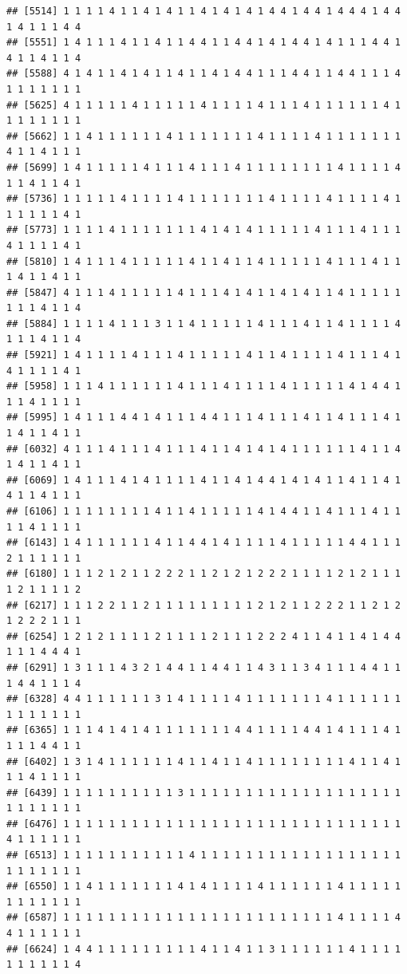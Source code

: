 \documentclass[
]{article}
\begin{document}
\begin{verbatim}
## [5514] 1 1 1 1 4 1 1 4 1 4 1 1 4 1 4 1 4 1 4 4 1 4 4 1 4 4 4 1 4 4 1 4 1 1 1 4 4
## [5551] 1 4 1 1 1 4 1 1 4 1 1 4 4 1 1 4 4 1 4 1 4 4 1 4 1 1 1 4 4 1 4 1 1 4 1 1 4
## [5588] 4 1 4 1 1 4 1 4 1 1 4 1 1 4 1 4 4 1 1 1 4 4 1 1 4 4 1 1 1 4 1 1 1 1 1 1 1
## [5625] 4 1 1 1 1 1 4 1 1 1 1 1 4 1 1 1 1 4 1 1 1 4 1 1 1 1 1 1 4 1 1 1 1 1 1 1 1
## [5662] 1 1 4 1 1 1 1 1 1 4 1 1 1 1 1 1 1 4 1 1 1 1 4 1 1 1 1 1 1 1 4 1 1 4 1 1 1
## [5699] 1 4 1 1 1 1 1 4 1 1 1 4 1 1 1 4 1 1 1 1 1 1 1 1 4 1 1 1 1 4 1 1 4 1 1 4 1
## [5736] 1 1 1 1 1 4 1 1 1 1 4 1 1 1 1 1 1 1 4 1 1 1 1 4 1 1 1 1 4 1 1 1 1 1 1 4 1
## [5773] 1 1 1 1 4 1 1 1 1 1 1 1 4 1 4 1 4 1 1 1 1 1 4 1 1 1 4 1 1 1 4 1 1 1 1 4 1
## [5810] 1 4 1 1 1 4 1 1 1 1 1 4 1 1 4 1 1 4 1 1 1 1 1 4 1 1 1 4 1 1 1 4 1 1 4 1 1
## [5847] 4 1 1 1 4 1 1 1 1 1 4 1 1 1 4 1 4 1 1 4 1 4 1 1 4 1 1 1 1 1 1 1 1 4 1 1 4
## [5884] 1 1 1 1 4 1 1 1 3 1 1 4 1 1 1 1 1 4 1 1 1 4 1 1 4 1 1 1 1 4 1 1 1 4 1 1 4
## [5921] 1 4 1 1 1 1 4 1 1 1 4 1 1 1 1 1 4 1 1 4 1 1 1 1 4 1 1 1 4 1 4 1 1 1 1 4 1
## [5958] 1 1 1 4 1 1 1 1 1 1 4 1 1 1 4 1 1 1 1 4 1 1 1 1 1 4 1 4 4 1 1 1 4 1 1 1 1
## [5995] 1 4 1 1 1 4 4 1 4 1 1 1 4 4 1 1 1 4 1 1 1 4 1 1 4 1 1 1 4 1 1 4 1 1 4 1 1
## [6032] 4 1 1 1 4 1 1 1 4 1 1 1 4 1 1 4 1 4 1 4 1 1 1 1 1 1 4 1 1 4 1 4 1 1 4 1 1
## [6069] 1 4 1 1 1 4 1 4 1 1 1 1 4 1 1 4 1 4 4 1 4 1 4 1 1 4 1 1 4 1 4 1 1 4 1 1 1
## [6106] 1 1 1 1 1 1 1 1 4 1 1 4 1 1 1 1 1 4 1 4 4 1 1 4 1 1 1 4 1 1 1 1 4 1 1 1 1
## [6143] 1 4 1 1 1 1 1 1 4 1 1 4 4 1 4 1 1 1 1 4 1 1 1 1 1 4 4 1 1 1 2 1 1 1 1 1 1
## [6180] 1 1 1 2 1 2 1 1 2 2 2 1 1 2 1 2 1 2 2 2 1 1 1 1 2 1 2 1 1 1 1 2 1 1 1 1 2
## [6217] 1 1 1 2 2 1 1 2 1 1 1 1 1 1 1 1 1 2 1 2 1 1 2 2 2 1 1 2 1 2 1 2 2 2 1 1 1
## [6254] 1 2 1 2 1 1 1 1 2 1 1 1 1 2 1 1 1 2 2 2 4 1 1 4 1 1 4 1 4 4 1 1 1 4 4 4 1
## [6291] 1 3 1 1 1 4 3 2 1 4 4 1 1 4 4 1 1 4 3 1 1 3 4 1 1 1 4 4 1 1 1 4 4 1 1 1 4
## [6328] 4 4 1 1 1 1 1 1 3 1 4 1 1 1 1 4 1 1 1 1 1 1 1 4 1 1 1 1 1 1 1 1 1 1 1 1 1
## [6365] 1 1 1 4 1 4 1 4 1 1 1 1 1 1 1 4 4 1 1 1 1 4 4 1 4 1 1 1 4 1 1 1 1 4 4 1 1
## [6402] 1 3 1 4 1 1 1 1 1 1 4 1 1 4 1 1 4 1 1 1 1 1 1 1 1 4 1 1 4 1 1 1 4 1 1 1 1
## [6439] 1 1 1 1 1 1 1 1 1 1 3 1 1 1 1 1 1 1 1 1 1 1 1 1 1 1 1 1 1 1 1 1 1 1 1 1 1
## [6476] 1 1 1 1 1 1 1 1 1 1 1 1 1 1 1 1 1 1 1 1 1 1 1 1 1 1 1 1 1 1 4 1 1 1 1 1 1
## [6513] 1 1 1 1 1 1 1 1 1 1 1 4 1 1 1 1 1 1 1 1 1 1 1 1 1 1 1 1 1 1 1 1 1 1 1 1 1
## [6550] 1 1 4 1 1 1 1 1 1 1 4 1 4 1 1 1 1 4 1 1 1 1 1 1 4 1 1 1 1 1 1 1 1 1 1 1 1
## [6587] 1 1 1 1 1 1 1 1 1 1 1 1 1 1 1 1 1 1 1 1 1 1 1 1 4 1 1 1 1 4 4 1 1 1 1 1 1
## [6624] 1 4 4 1 1 1 1 1 1 1 1 1 4 1 1 4 1 1 3 1 1 1 1 1 1 4 1 1 1 1 1 1 1 1 1 1 4

\end{verbatim}
\end{document}
